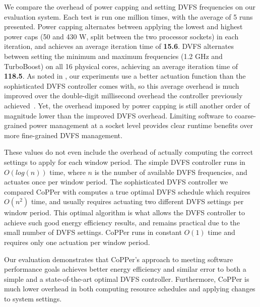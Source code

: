 We compare the overhead of power capping and setting DVFS frequencies on our evaluation system.
Each test is run one million times, with the average of 5 runs presented.
Power capping alternates between applying the lowest and highest power caps (50 and 430 W, split between the two processor sockets) in each iteration, and achieves an average iteration time of \textbf{15.6\us}.
DVFS alternates between setting the minimum and maximum frequencies (1.2 GHz and TurboBoost) on all 16 physical cores, achieving an average iteration time of \textbf{118.5\us}.
As noted in , our experiments use a better actuation function than the sophisticated DVFS controller comes with, so this average overhead is much improved over the double-digit millisecond overhead the controller previously achieved~\cite{POETMCSoC}.
Yet, the overhead imposed by power capping is still another order of magnitude lower than the improved DVFS overhead.
Limiting software to coarse-grained power management at a socket level provides clear runtime benefits over more fine-grained DVFS management.

These values do not even include the overhead of actually computing the correct settings to apply for each window period.
The simple DVFS controller runs in $O(log(n))$ time, where $n$ is the number of available DVFS frequencies, and actuates once per window period.
The sophisticated DVFS controller we compared CoPPer with computes a true optimal DVFS schedule which requires $O(n^2)$ time, and usually requires actuating two different DVFS settings per window period.
This optimal algorithm is what allows the DVFS controller to achieve such good energy efficiency results, and remains practical due to the small number of DVFS settings.
CoPPer runs in constant $O(1)$ time and requires only one actuation per window period.


Our evaluation demonstrates that CoPPer's approach to meeting software performance goals achieves better energy efficiency and similar error to both a simple and a state-of-the-art optimal DVFS controller.
Furthermore, CoPPer is much lower overhead in both computing resource schedules and applying changes to system settings.
